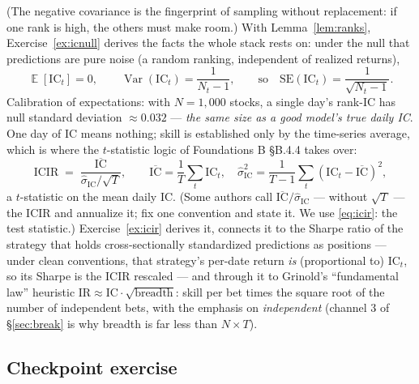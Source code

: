 \documentclass[11pt]{article}
\numberwithin{equation}{section}
\theoremstyle{plain}
\theoremstyle{definition}
\theoremstyle{remark}
\newcounter{exercise}
\DeclareMathOperator{\E}{\mathbb{E}}
\DeclareMathOperator{\Var}{Var}
\newcommand{\IC}{\mathrm{IC}}
\newcommand{\ICIR}{\mathrm{ICIR}}
\begin{document}
(The negative covariance is the fingerprint of sampling without replacement: if one rank is high, the others must make room.) With Lemma~\ref{lem:ranks}, Exercise~\ref{ex:icnull} derives the facts the whole stack rests on: under the null that predictions are pure noise (a random ranking, independent of realized returns),
\begin{equation}
\E[\IC_t] = 0,
\qquad
\Var(\IC_t) = \frac{1}{N_t - 1},
\qquad
\text{so}\quad \mathrm{SE}(\IC_t) = \frac{1}{\sqrt{N_t - 1}} .
\label{eq:icnull}
\end{equation}
Calibration of expectations: with $N = 1{,}000$ stocks, a single day's rank-IC has null standard deviation $\approx 0.032$ --- \emph{the same size as a good model's true daily IC}. One day of IC means nothing; skill is established only by the time-series average, which is where the $t$-statistic logic of Foundations B \S B.4.4 takes over:
\begin{equation}
\ICIR \;=\; \frac{\overline{\IC}}{\hat\sigma_{\IC} / \sqrt{T}} ,
\qquad
\overline{\IC} = \frac1T \sum_t \IC_t,
\quad \hat\sigma_{\IC}^2 = \frac{1}{T-1}\sum_t (\IC_t - \overline{\IC})^2 ,
\label{eq:icir}
\end{equation}
a $t$-statistic on the mean daily IC. (Some authors call $\overline{\IC}/\hat\sigma_{\IC}$ --- without $\sqrt{T}$ --- the ICIR and annualize it; fix one convention and state it. We use \eqref{eq:icir}: the test statistic.) Exercise~\ref{ex:icir} derives it, connects it to the Sharpe ratio of the strategy that holds cross-sectionally standardized predictions as positions --- under clean conventions, that strategy's per-date return \emph{is} (proportional to) $\IC_t$, so its Sharpe is the ICIR rescaled --- and through it to Grinold's ``fundamental law'' heuristic $\mathrm{IR} \approx \IC \cdot \sqrt{\text{breadth}}$: skill per bet times the square root of the number of independent bets, with the emphasis on \emph{independent} (channel 3 of \S\ref{sec:break} is why breadth is far less than $N \times T$).


\subsection*{Checkpoint exercise}
\end{document}
